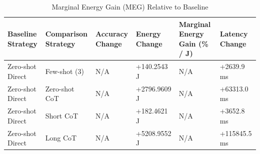 \begin{table}
\caption{Marginal Energy Gain (MEG) Relative to Baseline}
\label{tab:marginal_energy_gain}
\begin{tabular}{llllll}
\toprule
Baseline Strategy & Comparison Strategy & Accuracy Change & Energy Change & Marginal Energy Gain (\% / J) & Latency Change \\
\midrule
Zero-shot Direct & Few-shot (3) & N/A & +140.2543 J & N/A & +2639.9 ms \\
Zero-shot Direct & Zero-shot CoT & N/A & +2796.9609 J & N/A & +63313.0 ms \\
Zero-shot Direct & Short CoT & N/A & +182.4621 J & N/A & +3652.8 ms \\
Zero-shot Direct & Long CoT & N/A & +5208.9552 J & N/A & +115845.5 ms \\
\bottomrule
\end{tabular}
\end{table}
